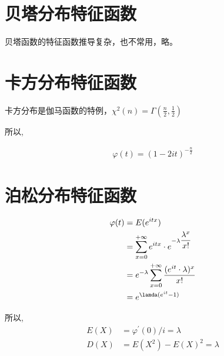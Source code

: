 \documentclass[12pt, a4paper, oneside]{ctexbook}
\begin{document}
\section{贝塔分布特征函数}
贝塔函数的特征函数推导复杂，也不常用，略。

\section{卡方分布特征函数}
卡方分布是伽马函数的特例，$\chi^{2}(n) = \Gamma(\frac{n}{2}, \frac{1}{2})$

所以,

\begin{align*}
    \varphi(t) = (1 - 2it)^{-\frac{n}{2}}
\end{align*}

\section{泊松分布特征函数}
\begin{align*}
    \varphi(t) &= E(e^{itx}) \\
    &= \sum\limits_{x = 0}^{+\infty} e^{itx} \cdot e^{-\lambda \dfrac{\lambda^{x}}{x!}} \\
    &= e^{-\lambda} \sum\limits_{x = 0}^{+\infty}\dfrac{(e^{it} \cdot \lambda)^{x}}{x!} \\
    &= e^{\lamda(e^{it} - 1)} 
\end{align*}

所以,
\begin{align*}
    E(X) &= \varphi^{'}(0) / i = \lambda\\
    D(X) &= E(X^{2}) - E(X)^{2} = \lambda
\end{align*}
\end{document}
